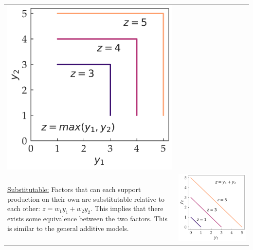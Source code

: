 \begin{table}[h!]
\begin{tabular}{m{}c}
\begin{minipage}{.17\textwidth}
      \includegraphics[width=\textwidth, height=.975\textwidth]{Figures/Antagonistic.pdf}
    \end{minipage}
    \\
    \vspace{-10pt}
    \uline{Substitutable:} Factors that can each support production on their own are substitutable relative to each other: $z = w_1y_1 + w_2y_2$. This implies that there exists some equivalence between the two factors. This is similar to the general additive models.
    &
    \begin{minipage}{.17\textwidth}
      \includegraphics[width=\textwidth, height=.975\textwidth]{Figures/Substitutable.pdf}

\end{minipage}
\end{tabular}
\end{table}
